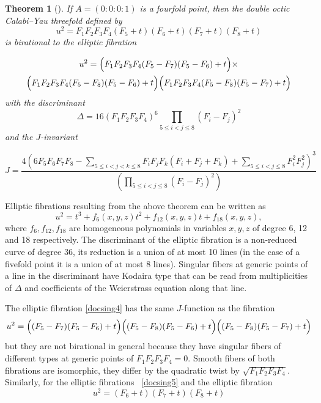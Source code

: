 \documentclass[12pt]{amsart}
\theoremstyle{plain}
\newtheorem{theorem}{Theorem}[section]
\theoremstyle{remark}
\theoremstyle{definition}
\numberwithin{table}{section}
\begin{document}
\begin{theorem}[\mbox{\cite[Thm. 2.2]{CK-C2}}]\label{thm:ellfour}
	If $A=(0:0:0:1)$ is a fourfold point, then
	the double octic Calabi--Yau threefold defined by
	\begin{equation}\label{docsing4}
		u^{2}=F_{1}F_{2}F_{3}F_{4}(F_{5}+t)
		(F_{6}+t)(F_{7}+t)(F_{8}+t)
	\end{equation}
	is birational to the elliptic fibration

	\begin{multline*}
		u^{2}  = \Bigl(F_{1}F_{2}F_{3}F_{4} (F_{5} - F_{7}) (F_{5} - F_{6}) + t\Bigr) \times\\
		\Bigl(F_{1}F_{2}F_{3}F_{4} (F_{5} - F_{8}) (F_{5} - F_{6}) + t\Bigr)\Bigl(F_{1}F_{2}F_{3}F_{4} (F_{5} - F_{8}) (F_{5} - F_{7}) + t\Bigr)
	\end{multline*}
	with the discriminant
	\[\Delta = 16 (F_{1}F_{2}F_{3}F_{4})^{6}
	\prod\limits_{5\le i<j\le 8}\left({F_{i}}  -{F_{j}}  \right)^{2}
	\]
	and the $J$-invariant

	\[
	J = \frac
	{4\left(6F_{5}F_{6}F_{7}F_{8}  -\sum\limits_{5\le i<j<k\le 8}F_{i}F_{j}F_{k}(F_{i}+F_{j}+F_{k}) + \sum\limits_{5\le i<j\le 8}F_{i}^{2}F_{j}^{2}
		\right)^{3}}
	{\left(\prod\limits_{5\le i<j\le 8}(F_{i}-F_{j})^{2}\right)}
	\]

\end{theorem}

Elliptic fibrations resulting from the above theorem can be written as
\[u^{2}=t^{3}+f_{6}(x,y,z)t^{2}+f_{12}(x,y,z)t+f_{18}(x,y,z),\]
where $f_{6}, f_{12}, f_{18}$ are homogeneous polynomials in variables $x,y,z$ of degree 6, 12 and 18 respectively. The discriminant of the elliptic fibration is a non-reduced curve of degree 36, its reduction is a union of at most 10 lines (in the case of a fivefold point it is a union of at most 8 lines). Singular fibers at generic points of a line in the discriminant have Kodaira type that can be read from multiplicities of $\Delta$ and coefficients of the Weierstrass equation along that line.

The elliptic fibration \eqref{docsing4}  has the same $J$-function as the fibration
\[			u^{2}  = \Bigl( (F_{5} - F_{7}) (F_{5} - F_{6}) + t\Bigr)
\Bigl( (F_{5} - F_{8}) (F_{5} - F_{6}) + t\Bigr)\Bigl((F_{5} - F_{8}) (F_{5} - F_{7}) + t\Bigr)
\]
but they  are not birational in general because they have singular fibers of different types at generic points of $F_{1}F_{2}F_{3}F_{4} = 0$.
Smooth fibers of both fibrations are isomorphic, they differ by the quadratic twist by
$\sqrt{F_{1}F_{2}F_{3}F_{4}}$.
Similarly, for the elliptic fibrations ~\eqref{docsing5} and the elliptic fibration
\[
u^{2}=(F_{6}+t)(F_{7}+t)(F_{8}+t)
\]
\end{document}
